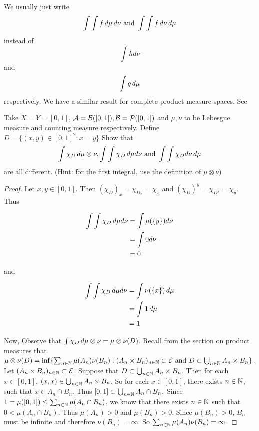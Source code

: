 \documentclass{book}
\begin{document}
	\begin{note}
		We usually just write $$\int \int f \, d \mu \, d \nu \text{ and } \int \int f \, d \nu \, d \mu$$ instead of $$\int h d\nu$$ and $$\int g \, d \mu $$ respectively. We have a similar result for complete product measure spaces. See 
	\end{note}
	
	\begin{ex}  
		Take $X=Y= [0,1]$, $\mathcal{A} = \mathcal{B}([0,1]), \mathcal{B} = \mathcal{P}([0,1])$ and $\mu,\nu$ to be Lebesgue measure and counting measure respectively. Define $D = \{(x,y) \in [0,1]^2: x=y\}$ Show that $$\int \chi_D \, d \mu \otimes \nu, \int \int \chi_D \, d \mu d \nu \text{ and } \int \int \chi_D d\nu \, d \mu$$ are all different. (Hint: for the first integral, use the definition of $\mu \otimes \nu$)
	\end{ex}
	
	\begin{proof}
		Let $x,y \in [0,1]$. Then $(\chi_D)_x = \chi_{D_x} = \chi_{x}$ and $(\chi_D)^y = \chi_{D^y} = \chi_{y}$. Thus
		
		\begin{align*}
			\int \int \chi_D \, d \mu d \nu
			&= \int \mu(\{y\}) d\nu\\
			&= \int 0 d\nu\\
			&= 0
		\end{align*}
		
		and
		
		\begin{align*}
			\int \int \chi_D \, d \mu d \nu
			&= \int \nu(\{x\}) \, d \mu\\
			&= \int 1 \, d \mu\\
			&= 1
		\end{align*}
		
		Now, Observe that $\int \chi_D \, d \mu \otimes \nu = \mu \otimes \nu(D)$. Recall from the section on product measures that $\mu \otimes \nu(D) = \inf \{\sum_{n \in \mathbb{N}}\mu(A_n)\nu(B_n): (A_n \times B_n)_{n \in \mathbb{N}} \subset \mathcal{E} \text{ and } D \subset \bigcup_{n \in \mathbb{N}} A_n \times B_n \}$. Let $(A_n \times B_n)_{n \in \mathbb{N}} \subset \mathcal{E}$. Suppose that $D \subset \bigcup_{n \in \mathbb{N}}A_n \times B_n$. Then for each $x \in [0,1]$, $(x,x) \in  \bigcup_{n \in \mathbb{N}} A_n \times B_n$. So for each $x \in [0,1]$, there exists $n \in \mathbb{N}$, such that $x \in A_n \cap B_n$. Thus $[0,1] \subset \bigcup_{n \in \mathbb{N}} A_n \cap B_n.$ Since $1  = \mu([0,1]) \leq \sum_{n \in \mathbb{N}}\mu(A_n \cap B_n)$, we know that there exists $n \in \mathbb{N}$ such that $0 < \mu(A_n \cap B_n)$. Thus $\mu(A_n)> 0$ and $\mu(B_n) > 0$. Since $\mu(B_n) > 0$, $B_n$ must be infinite and therefore $\nu(B_n) = \infty$. So $\sum_{n \in \mathbb{N}} \mu(A_n)\nu(B_n) = \infty$.
		
	\end{proof}
	
\end{document}
